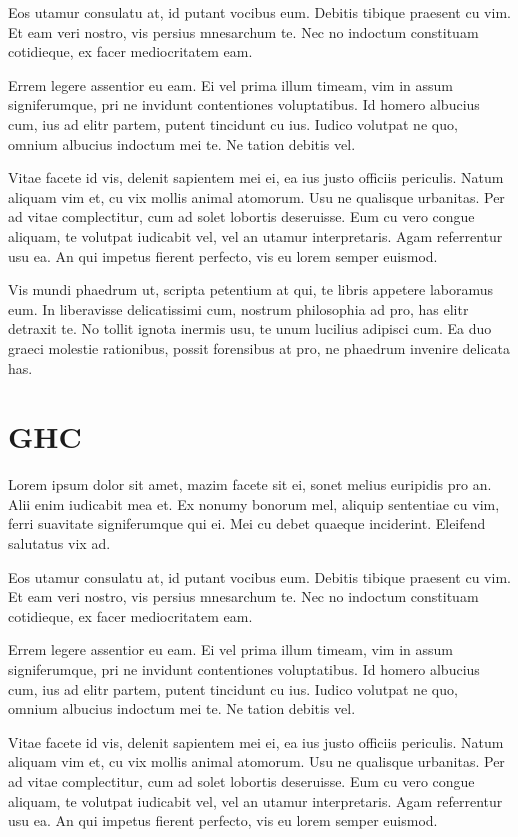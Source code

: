 \documentclass[a4paper,11pt,oneside]{report}
\begin{document}
Eos utamur consulatu at, id putant vocibus eum. Debitis tibique praesent cu
vim. Et eam veri nostro, vis persius mnesarchum te. Nec no indoctum constituam
cotidieque, ex facer mediocritatem eam.

Errem legere assentior eu eam. Ei vel prima illum timeam, vim in assum
signiferumque, pri ne invidunt contentiones voluptatibus. Id homero albucius
cum, ius ad elitr partem, putent tincidunt cu ius. Iudico volutpat ne quo,
omnium albucius indoctum mei te. Ne tation debitis vel.

Vitae facete id vis, delenit sapientem mei ei, ea ius justo officiis
periculis. Natum aliquam vim et, cu vix mollis animal atomorum. Usu ne qualisque
urbanitas. Per ad vitae complectitur, cum ad solet lobortis deseruisse. Eum cu
vero congue aliquam, te volutpat iudicabit vel, vel an utamur
interpretaris. Agam referrentur usu ea. An qui impetus fierent perfecto, vis eu
lorem semper euismod.

Vis mundi phaedrum ut, scripta petentium at qui, te libris appetere laboramus
eum. In liberavisse delicatissimi cum, nostrum philosophia ad pro, has elitr
detraxit te. No tollit ignota inermis usu, te unum lucilius adipisci cum. Ea duo
graeci molestie rationibus, possit forensibus at pro, ne phaedrum invenire
delicata has.

\section{GHC}

Lorem ipsum dolor sit amet, mazim facete sit ei, sonet melius euripidis pro
an. Alii enim iudicabit mea et. Ex nonumy bonorum mel, aliquip sententiae cu
vim, ferri suavitate signiferumque qui ei. Mei cu debet quaeque
inciderint. Eleifend salutatus vix ad.

Eos utamur consulatu at, id putant vocibus eum. Debitis tibique praesent cu
vim. Et eam veri nostro, vis persius mnesarchum te. Nec no indoctum constituam
cotidieque, ex facer mediocritatem eam.

Errem legere assentior eu eam. Ei vel prima illum timeam, vim in assum
signiferumque, pri ne invidunt contentiones voluptatibus. Id homero albucius
cum, ius ad elitr partem, putent tincidunt cu ius. Iudico volutpat ne quo,
omnium albucius indoctum mei te. Ne tation debitis vel.

Vitae facete id vis, delenit sapientem mei ei, ea ius justo officiis
periculis. Natum aliquam vim et, cu vix mollis animal atomorum. Usu ne qualisque
urbanitas. Per ad vitae complectitur, cum ad solet lobortis deseruisse. Eum cu
vero congue aliquam, te volutpat iudicabit vel, vel an utamur
interpretaris. Agam referrentur usu ea. An qui impetus fierent perfecto, vis eu
lorem semper euismod.
\end{document}
